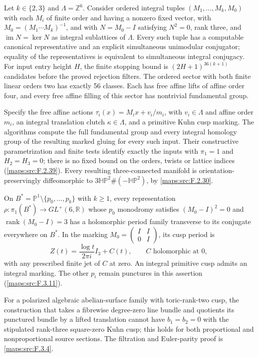 \hypertarget{main-V-F}{}
\begin{maintheorem}
\hypertarget{tag-03KW}{}\label{series:V:F}
Let $k\in\{2,3\}$ and $\Lambda=\mathbb Z^6$.
Consider ordered integral tuples $(M_1,\ldots,M_k,M_0)$ with each
$M_i$ of finite order and having a nonzero fixed vector, with
$M_0=(M_1\cdots M_k)^{-1}$, and with
$N=M_0-I$ satisfying $N^2=0$, rank three, and
$\operatorname{im}N=\ker N$ as integral sublattices of $\Lambda$.
Every such tuple has a computable canonical representative and an
explicit simultaneous unimodular conjugator; equality of the
representatives is equivalent to simultaneous integral conjugacy.
For input entry height $H$, the finite stopping bound is
$(2H+1)^{36(k+1)}$ candidates before the proved rejection filters.
The ordered sector with both finite linear orders two has exactly
56 classes.  Each has free affine lifts of affine order four,
and every free affine filling of this sector has nontrivial
fundamental group.

Specify the free affine actions
$\tau_i(x)=M_ix+v_i/m_i$, with $v_i\in\Lambda$ and affine order $m_i$, an integral translation clutch $\kappa\in\Lambda$,
and a primitive Kuhn cusp marking.  The algorithms compute the
full fundamental group and every integral homology group of the
resulting marked gluing for every such input.  Their constructive
parametrization and finite tests identify exactly the inputs with
$\pi_1=1$ and $H_2=H_3=0$; there is no fixed bound on the
orders, twists or lattice indices (\cref{maps:src:F.2.39}).
Every resulting three-connected manifold is orientation-preservingly
diffeomorphic to $3\mathbb{HP}^2\#(-\mathbb{HP}^2)$, by
\cref{maps:src:F.2.30}.

On $B^*=\mathbb P^1\setminus\{p_0,\ldots,p_k\}$ with $k\ge1$,
every representation $\rho:\pi_1(B^*)\to GL^+(6,\mathbb R)$
whose $p_0$ monodromy satisfies $(M_0-I)^2=0$ and
$\operatorname{rank}(M_0-I)=3$ has a holomorphic period family
transverse to its conjugate everywhere on $B^*$. In the marking
$M_0=\left(\begin{smallmatrix}I&I\\0&I\end{smallmatrix}\right)$,
its cusp period is
\[
 Z(t)=\frac{\log t}{2\pi i}I_3+C(t),\qquad C\text{ holomorphic at }0,
\]
with any prescribed finite jet of $C$ at zero. An integral primitive
cusp admits an integral marking. The other $p_i$ remain punctures
in this assertion (\cref{maps:src:F.3.11}).

For a polarized algebraic abelian-surface family with toric-rank-two
cusp, the construction that takes a fibrewise degree-zero line bundle
and quotients its punctured bundle by a lifted translation cannot
have $b_1=b_2=0$ with the stipulated rank-three square-zero Kuhn
cusp; this holds for both proportional and nonproportional source
sections. The filtration and Euler-parity proof is
\cref{maps:src:F.3.4}.

\end{maintheorem}

